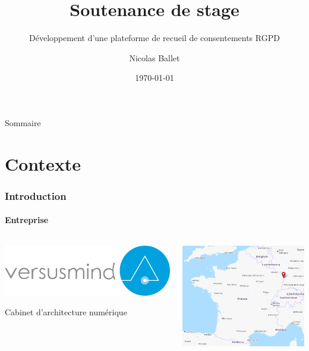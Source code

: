 \documentclass[aspectratio=169]{beamer}
\title[Développement d’une plateforme de recueil de consentements RGPD]{Soutenance de stage}
\subtitle{Développement d’une plateforme de recueil de consentements RGPD}
\author{Nicolas Ballet}
\institute[UTBM]{Université de Technologie de Belfort Montbéliard}
\date[\the\year-\twodigits\month-\twodigits\day]{\today}
\begin{document}
\begin{frame}
    \titlepage{}
\end{frame}
\begin{frame}{Sommaire}
    \tableofcontents
\end{frame}

\section{Contexte}
\begin{frame}
    \frametitle{Introduction}
    \framesubtitle{Entreprise}
    \begin{columns}
        \hfill
        \begin{column}{0.45\textwidth}
            \begin{center}
                \hfill\includegraphics[width=1.0\textwidth]{versusmind.png}
            \end{center}
            \hfill \color{gray} Cabinet d'architecture numérique   
        \end{column}
        \begin{column}{0.5\textwidth}
            \begin{center}
                \includegraphics[width=1.0\textwidth]{strasbourg.png}
            \end{center}
        \end{column}
    \end{columns}
\end{frame}
\end{document}

